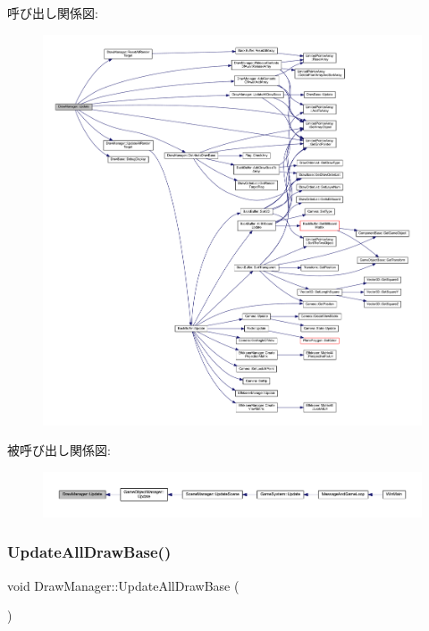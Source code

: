 呼び出し関係図\+:
\nopagebreak
\begin{figure}[H]
\begin{center}
\leavevmode
\includegraphics[width=350pt]{class_draw_manager_af498c44ff698bf3ef473df970e24c917_cgraph}
\end{center}
\end{figure}
被呼び出し関係図\+:
\nopagebreak
\begin{figure}[H]
\begin{center}
\leavevmode
\includegraphics[width=350pt]{class_draw_manager_af498c44ff698bf3ef473df970e24c917_icgraph}
\end{center}
\end{figure}
\mbox{\label{class_draw_manager_a7c989a2beae5de5a1fc7ab0bef8692f9}} 
\subsubsection{\texorpdfstring{Update\+All\+Draw\+Base()}{UpdateAllDrawBase()}}
{\footnotesize\ttfamily void Draw\+Manager\+::\+Update\+All\+Draw\+Base (\begin{DoxyParamCaption}{ }\end{DoxyParamCaption})\hspace{0.3cm}{\ttfamily [private]}}



